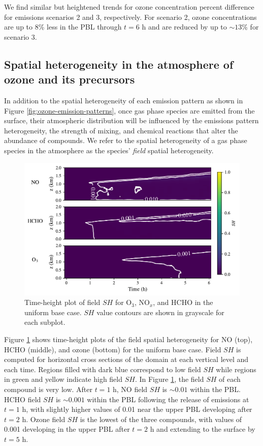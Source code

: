 We find similar but heightened trends for ozone concentration percent difference for emissions scenarios 2 and 3, respectively. For scenario 2, ozone concentrations are up to 8\% less in the PBL through $t=6$ h and are reduced by up to $\sim13$\% for scenario 3.

\subsection{Spatial heterogeneity in the atmosphere of ozone and its precursors}

In addition to the spatial heterogeneity of each emission pattern as shown in Figure \ref{fig:ozone-emission-patterns}, once gas phase species are emitted from the surface, their atmospheric distribution will be influenced by the emissions pattern heterogeneity, the strength of mixing, and chemical reactions that alter the abundance of compounds. We refer to the spatial heterogeneity of a gas phase species in the atmosphere as the species' {\it field} spatial heterogeneity. 

\begin{figure}[h]
    \centering
    \includegraphics[width=.97\textwidth]{figures/chapter4/height-time-nsh-multivar-uniform-basecase.pdf}
    \caption{Time-height plot of field $SH$ for O$_3$, NO$_x$, and HCHO in the uniform base case. $SH$ value contours are shown in grayscale for each subplot.}
    \label{fig:atmos-sh-ub}
  \end{figure}

Figure \ref{fig:atmos-sh-ub} shows time-height plots of the field spatial heterogeneity for NO (top), HCHO (middle), and ozone (bottom) for the uniform base case. Field $SH$ is computed for horizontal cross sections of the domain at each vertical level and each time. Regions filled with dark blue correspond to low field $SH$ while regions in green and yellow indicate high field $SH$. In Figure \ref{fig:atmos-sh-ub}, the field $SH$ of each compound is very low. After $t=1$ h, NO field $SH$ is $\sim0.01$ within the PBL. HCHO field $SH$ is $\sim0.001$ within the PBL following the release of emissions at $t=1$ h, with slightly higher values of 0.01 near the upper PBL developing after $t=2$ h. Ozone field $SH$ is the lowest of the three compounds, with values of 0.001 developing in the upper PBL after $t=2$ h and extending to the surface by $t=5$ h.

